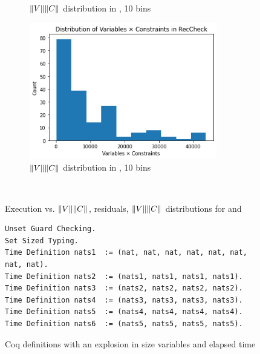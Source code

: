 \begin{figure}
\begin{subfigure}{0.475\textwidth}
\caption{$\lVert V\rVert\lVert C\rVert$ distribution in \solve, 10 bins}
\label{fig:stats:distr-solve}
\end{subfigure}
\hfill
\begin{subfigure}{0.475\textwidth}
\includegraphics[width=0.9\textwidth]{images/distribution-RecCheck.png}
\caption{$\lVert V\rVert\lVert C\rVert$ distribution in \RecCheck, 10 bins}
\label{fig:stats:distr-reccheck}
\end{subfigure}
\\[2ex]
\caption{Execution vs. $\lVert V\rVert\lVert C\rVert$, residuals, $\lVert V\rVert\lVert C\rVert$ distributions for \solve and \RecCheck}
\label{fig:stats}
\end{figure}

\begin{figure}
\begin{verbatim}
Unset Guard Checking.
Set Sized Typing.
Time Definition nats1  := (nat, nat, nat, nat, nat, nat, nat, nat).
Time Definition nats2  := (nats1, nats1, nats1, nats1).
Time Definition nats3  := (nats2, nats2, nats2, nats2).
Time Definition nats4  := (nats3, nats3, nats3, nats3).
Time Definition nats5  := (nats4, nats4, nats4, nats4).
Time Definition nats6  := (nats5, nats5, nats5, nats5).
\end{verbatim}
\caption{Coq definitions with an explosion in size variables and elapsed time}
\label{fig:nats}
\end{figure}